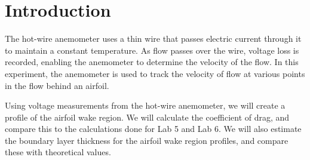 \chapter{Introduction}
\label{cp:introduction}
The hot-wire anemometer uses a thin wire that passes electric current through it to maintain a constant temperature. As flow passes over the wire, voltage loss is recorded, enabling the anemometer to determine the velocity of the flow. In this experiment, the anemometer is used to track the velocity of flow at various points in the flow behind an airfoil. 

Using voltage measurements from the hot-wire anemometer, we will create a profile of the airfoil wake region. We will calculate the coefficient of drag, and compare this to the calculations done for Lab 5 and Lab 6. We will also estimate the boundary layer thickness for the airfoil wake region profiles, and compare these with theoretical values.